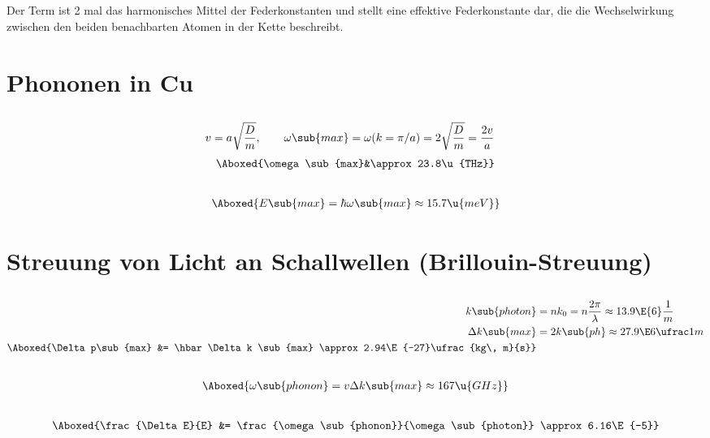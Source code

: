 \documentclass[exa]{exercise_5.0}
\begin{document}
\subsection{}
Der Term ist 2 mal das harmonisches Mittel der Federkonstanten und stellt eine effektive Federkonstante dar, die die Wechselwirkung zwischen den beiden benachbarten Atomen in der Kette beschreibt. 

\section{Phononen in Cu}
\subsection{}
\begin{align*}
    v &= a\sqrt{\frac{D}{m}},\qquad 
    \omega\sub{max} = \omega(k=\pi/a) 
    = 2\sqrt{\frac Dm} = \frac {2v}a
\end{align*}
\begin{align*}
    \Aboxed{\omega\sub{max}&\approx 23.8\u{THz}}
\end{align*}

\subsection{}
\begin{align*}
    \Aboxed{E\sub{max} = \hbar\omega\sub{max} \approx 15.7\u{meV}} 
\end{align*}

\section{Streuung von Licht an Schallwellen (Brillouin-Streuung)}
\subsection{}
\begin{align*}
    k\sub{photon} &= n k_0 
    = n \frac{2\pi}{\lambda}
    \approx 13.9\E{6} \frac1m\\
    \Delta k\sub{max} &= 2 k\sub{ph} \approx 27.9\E6\ufrac1m\\
    \Aboxed{\Delta p\sub{max} &= \hbar\Delta k \sub{max} \approx 2.94\E{-27}\ufrac{kg\, m}{s}}
\end{align*}

\subsection{}
\begin{align*}
\Aboxed{\omega\sub{phonon} = v \Delta k\sub{max} \approx 167\u{GHz}}
\end{align*}

\subsection{}
\begin{align*}
    \Aboxed{\frac{\Delta E}{E} &= \frac{\omega\sub{phonon}}{\omega\sub{photon}} \approx 6.16\E{-5}}
\end{align*}


\end{document}
